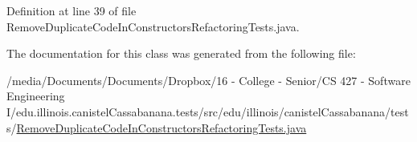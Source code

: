 Definition at line 39 of file RemoveDuplicateCodeInConstructorsRefactoringTests.java.



The documentation for this class was generated from the following file:\begin{DoxyCompactItemize}
\item 
/media/Documents/Documents/Dropbox/16 -\/ College -\/ Senior/CS 427 -\/ Software Engineering I/edu.illinois.canistelCassabanana.tests/src/edu/illinois/canistelCassabanana/tests/\hyperlink{RemoveDuplicateCodeInConstructorsRefactoringTests_8java}{RemoveDuplicateCodeInConstructorsRefactoringTests.java}\end{DoxyCompactItemize}
